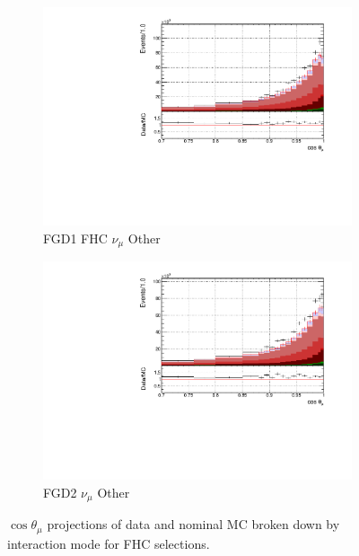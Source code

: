 \begin{figure}[!htbp]
\begin{subfigure}{0.49\textwidth}
  \centering
  \includegraphics[width=\textwidth]{figs/FGD1_numuCC_other_t}
  \caption{FGD1 FHC $\nu_{\mu}$ Other}
\end{subfigure}
\begin{subfigure}{0.49\textwidth}
  \centering
  \includegraphics[width=\textwidth]{figs/FGD2_numuCC_other_t}
  \caption{FGD2 $\nu_{\mu}$ Other}
\end{subfigure}
\caption{$\cos\theta_{\mu}$ projections of data and nominal MC broken down by interaction mode for FHC selections.}
\label{fig:tstack_fhc}
\end{figure}

